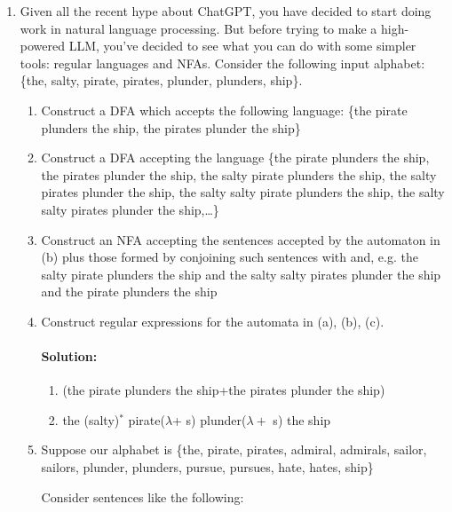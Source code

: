 \documentclass{article}
\begin{document}
\begin{enumerate} 

    \item Given all the recent hype about ChatGPT, you have decided to start doing work in natural language processing. But before trying to make a high-powered LLM, you've decided to see what you can do with some simpler tools: regular languages and NFAs. Consider the following input alphabet: \{the, salty, pirate, pirates, plunder, plunders, ship\}.

    \begin{enumerate}
        \item Construct a DFA which accepts the following language:
            \{the pirate plunders the ship, the pirates plunder the ship\}

        \item Construct a DFA accepting the language 
            \{the pirate plunders the ship, the pirates plunder the ship, the salty pirate plunders the ship, the salty pirates plunder the ship, the salty salty pirate plunders the ship, the salty salty pirates plunder the ship,\dots\}

        \item Construct an NFA accepting the sentences accepted by the automaton in (b) plus those formed by conjoining such sentences with and, e.g. the salty pirate plunders the ship and the salty salty pirates plunder the ship and the pirate plunders the ship

        \item Construct regular expressions for the automata in (a), (b), (c).
            \paragraph{Solution: }
            \begin{enumerate}[label= (\alph*)] 
                \item (the pirate plunders the ship+the pirates plunder the ship) %
                \item the (salty)$^*$ pirate($\lambda$+ s) plunder($\lambda+$ s) the ship %
            \end{enumerate}

        \item Suppose our alphabet is \{the, pirate, pirates, admiral, admirals, sailor, sailors, plunder, plunders, pursue, pursues, hate, hates, ship\}

        Consider sentences like the following:


\end{enumerate}
\end{enumerate}
\end{document}
